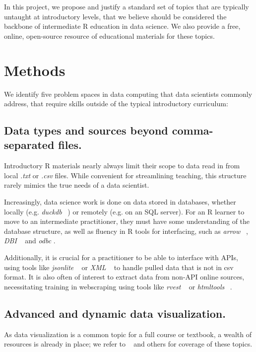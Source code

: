 \documentclass[10pt]{article}
\begin{document}
In this project, we propose and justify a standard set of topics that are typically untaught at introductory levels, that we believe should be considered the backbone of intermediate R education in data science.  We also provide a free, online, open-source resource of educational materials for these topics.

\section{Methods}

We identify five problem spaces in data computing that data scientists commonly address, that require skills outside of the typical introductory curriculum:

\subsection{Data types and sources beyond comma-separated files.}

Introductory R materials nearly always limit their scope to data read in from local \emph{.txt} or \emph{.csv} files.  While convenient for streamlining teaching, this structure rarely mimics the true needs of a data scientist.

Increasingly, data science work is done on data stored in databases, whether locally (e.g. \emph{duckdb} ~\cite{raasveldt2019duckdb}) or remotely (e.g. on an SQL server).  For an R learner to move to an intermediate practitioner, they must have some understanding of the database structure, as well as fluency in R tools for interfacing, such as \emph{arrow} ~\cite{arrow}, \emph{DBI} ~\cite{DBI} and \emph{odbc} \cite{odbc}.

Additionally, it is crucial for a practitioner to be able to interface with APIs, using tools like \emph{jsonlite} ~\cite{jsonlite} or \emph{XML} ~\cite{XML} to handle pulled data that is not in csv format.  It is also often of interest to extract data from non-API online sources, necessitating training in webscraping using tools like \emph{rvest} ~\cite{rvest} or \emph{htmltools} ~\cite{htmltools}.

\subsection{Advanced and dynamic data visualization.}

As data visualization is a common topic for a full course or textbook, a wealth of resources is already in place; we refer to ~\cite{wilke2019fundamentals,sievert2020interactive,sarkar2008multivariate} and others for coverage of these topics.
\end{document}
